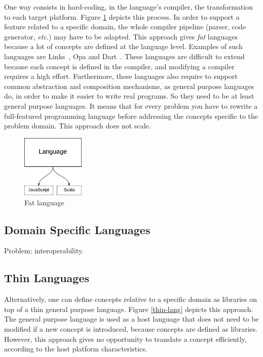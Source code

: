 \documentclass[preprint]{sigplanconf}
\newcommand{\etc}{\emph{etc.}}
\begin{document}
One way consists in hard-coding, in the language's compiler, the transformation to each target platform. Figure
\ref{fat-lang} depicts this process. In order to support a feature related to a specific domain, the whole compiler
pipeline (parser, code generator, \etc) may have to be adapted. This approach gives \emph{fat} languages because
a lot of concepts are defined at the language level. Examples of such languages are Links~\cite{Cooper07_Links},
Opa and Dart~\cite{Griffith11_Dart}. These languages are difficult to extend because each concept is defined in the
compiler, and modifying a compiler requires a high effort. Furthermore, these languages also require to support
common abstraction and composition mechanisms, as general purpose languages do, in order to make it easier to write
real programs. So they need to be at least general purpose languages. It means that for every problem you have to
rewrite a full-featured programming language before addressing the concepts specific to the problem domain. This
approach does not scale.

\begin{figure}
  \centering
  \includegraphics[width=3cm]{fat.pdf}
  \caption{Fat language}
  \label{fat-lang}
\end{figure}

\subsection{Domain Specific Languages}

Problem: interoperability.

\subsection{Thin Languages}

Alternatively, one can define concepts relative to a specific domain as libraries on top of a thin general purpose
language. Figure \ref{thin-lang} depicts this approach. The general purpose language is used as a host language that
does not need to be modified if a new concept is introduced, because concepts are defined as libraries. However,
this approach gives no opportunity to translate a concept efficiently, according to the host platform
characteristics.
\end{document}
